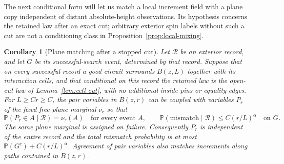 \documentclass[11pt]{article}
\newtheorem{corollary}[theorem]{Corollary}
\theoremstyle{definition}
\theoremstyle{remark}
\numberwithin{equation}{section}
\begin{document}
The next conditional form will let us match a local increment field with
a plane copy independent of distant absolute-height observations.  Its
hypothesis concerns the retained law after an exact cut; arbitrary exterior
spin labels without such a cut are not a conditioning class in
Proposition~\ref{prop:local-mixing}.

\begin{corollary}[Plane matching after a stopped cut]
\label{cor:conditional-plane-matching}
Let $\mathcal R$ be an exterior record, and let $G$ be its
successful-search event, determined by that record.  Suppose that on every successful record a good
circuit surrounds $B(z,L)$ together with its interaction cells, and that
conditional on this record the retained law is the open-cut law of
Lemma~\ref{lem:cell-cut}, with no additional inside pins or equality edges.
For $L\ge Cr\ge C$, the pair variables in $B(z,r)$ can be coupled with
variables $P_r$ of the fixed free-plane marginal $\nu_r$ so that
\[
 \mathbb P(P_r\in A\mid\mathcal R)=\nu_r(A)
 \quad\text{for every event }A,
 \qquad
 \mathbb P(\text{mismatch}\mid\mathcal R)\le C(r/L)^\alpha
 \quad\text{on }G.
\]
The same plane marginal is assigned on failure.  Consequently $P_r$ is
independent of the entire record and the total mismatch probability is at
most $\mathbb P(G^c)+C(r/L)^\alpha$.  Agreement of pair variables also matches
increments along paths contained in $B(z,r)$.
\end{corollary}
\end{document}
